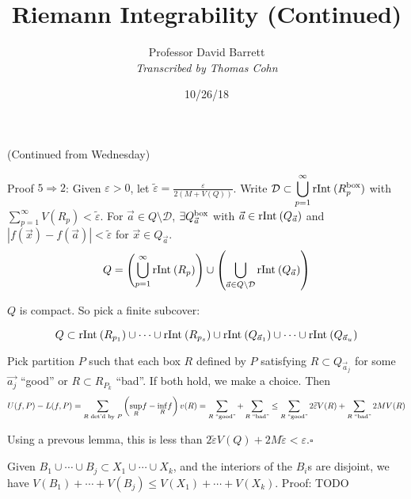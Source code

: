 \documentclass[10pt,letterpaper]{article}
\author{Professor David Barrett\\ \small\textit{Transcribed by Thomas Cohn}}
\title{Riemann Integrability (Continued)}
\date{10/26/18} %
\newcommand{\n}{\hfill\break}
\newcommand{\proven}{\;$\square$\n}
\newcommand{\ptxt}[1]{\textrm{\textnormal{#1}}}
\newcommand{\abs}[1]{\left|#1\right|}
\renewcommand{\epsilon}{\varepsilon}
\newcommand{\rInt}{\ptxt{rInt}\>}
\begin{document}
\maketitle
\setlength\RaggedRightParindent{\parindent}
\RaggedRight

\par\noindent (Continued from Wednesday)\n

\par\noindent Proof $5\Rightarrow{}2$: Given $\epsilon>0$, let $\displaystyle\widetilde{\epsilon}=\frac{\epsilon}{2(M+V(Q))}$. Write $\displaystyle\mathcal{D}\subset\bigcup_{p=1}^{\infty}\rInt(R_{p}^{\ptxt{box}})$ with $\displaystyle\sum_{p=1}^{\infty}V(R_{p})<\widetilde{\epsilon}$. For $\vec{a}\in{}Q\setminus\mathcal{D}$, $\exists{}Q_{\vec{a}}^{\ptxt{box}}$ with $\vec{a}\in\rInt(Q_{\vec{a}})$ and $\abs{f(\vec{x})-f(\vec{a})}<\widetilde{\epsilon}$ for $\vec{x}\in{}Q_{\vec{a}}$.\n
\n
\[
Q=\left(\bigcup_{p=1}^{\infty}\rInt(R_{p})\right)\cup\left(\bigcup_{\vec{a}\in{}Q\setminus\mathcal{D}}\rInt(Q_{\vec{a}})\right)
\]

\par\noindent $Q$ is compact. So pick a finite subcover:

\[
Q\subset\rInt(R_{p_{1}})\cup\cdots\cup\rInt(R_{p_{s}})\cup\rInt(Q_{\vec{a}_{1}})\cup\cdots\cup\rInt(Q_{\vec{a}_{u}})
\]

\par\noindent Pick partition $P$ such that each box $R$ defined by $P$ satisfying $R\subset{}Q_{\vec{a}_{j}}$ for some $\vec{a_{j}}$ ``good'' or $R\subset{}R_{P_{k}}$ ``bad''. If both hold, we make a choice. Then
\[
U(f,P)-L(f,P)=\sum_{R\ptxt{ det'd by }P}\left(\underset{R}{\sup}f-\underset{R}{\inf}f\right)v(R)=\sum_{R\ptxt{ ``good''}}+\sum_{R\ptxt{ ``bad''}}\le\sum_{R\ptxt{ ``good''}}2\widetilde{\epsilon}V(R)+\sum_{R\ptxt{ ``bad''}}2MV(R)
\]

\par\noindent Using a prevous lemma, this is less than $2\widetilde{\epsilon}V(Q)+2M\widetilde{\epsilon}<\epsilon$.\proven

\par\noindent Given $B_{1}\cup\cdots\cup{}B_{j}\subset{}X_{1}\cup\cdots\cup{}X_{k}$, and the interiors of the $B_{i}$s are disjoint, we have $V(B_{1})+\cdots+V(B_{j})\le{}V(X_{1})+\cdots+V(X_{k})$.\n
Proof: TODO
\end{document}
